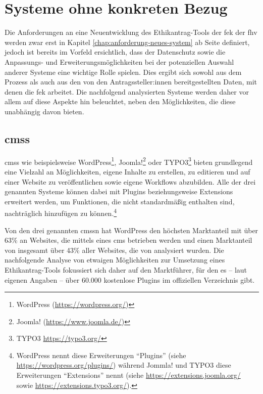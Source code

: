 \documentclass[a4paper,12pt,twoside]{scrreprt}
\begin{document}
\section{Systeme ohne konkreten Bezug}
\label{sec:systeme-ohne-bezug}

Die Anforderungen an eine Neuentwicklung des Ethikantrag-Tools der \ac{fek} der \ac{fhv} werden zwar erst in Kapitel \ref{chap:anforderung-neues-system} ab Seite \pageref{chap:anforderung-neues-system} definiert, jedoch ist bereits im Vorfeld ersichtlich, dass der Datenschutz sowie die Anpassungs- und Erweiterungsmöglichkeiten bei der potenziellen Auswahl anderer Systeme eine wichtige Rolle spielen. Dies ergibt sich sowohl aus dem Prozess als auch aus den von den Antragssteller:innen bereitgestellten Daten, mit denen die \acl{fek} arbeitet. Die nachfolgend analysierten Systeme werden daher vor allem auf diese Aspekte hin beleuchtet, neben den Möglichkeiten, die diese unabhängig davon bieten.

\subsection{\aclp{cms}}
\label{sub-sec:cms-syteme}

\acp{cms} wie beispielsweise WordPress\footnote{WordPress (\url{https://wordpress.org/})}, Joomla!\footnote{Joomla! (\url{https://www.joomla.de/})} oder TYPO3\footnote{TYPO3 \url{https://typo3.org/}} bieten grundlegend eine Vielzahl an Möglichkeiten, eigene Inhalte zu erstellen, zu editieren und auf einer Website zu veröffentlichen sowie eigene Workflows abzubilden. \cite{oracle_corporation_who_2022} Alle der drei genannten Systeme können dabei mit Plugins beziehungsweise Extensions erweitert werden, um Funktionen, die nicht standardmäßig enthalten sind, nachträglich hinzufügen zu können.\footnote{WordPress nennt diese Erweiterungen \enquote{Plugins} (siehe \url{https://wordpress.org/plugins/}) während Jommla! und TYPO3 diese Erweiterungen \enquote{Extensions} nennt (siehe \url{https://extensions.joomla.org/} sowie \url{https://extensions.typo3.org/}).}

\medskip

Von den drei genannten \aclp{cms}n hat WordPress den höchsten Marktanteil mit über 63\% an Websites, die mittels eines \ac{cms} betrieben werden und einen Marktanteil von insgesamt über 43\% aller Websites, die von \cite{q-success_di_gelbmann_gmbh_usage_2023} analysiert wurden. Die nachfolgende Analyse von etwaigen Möglichkeiten zur Umsetzung eines Ethikantrag-Tools fokussiert sich daher auf den Marktführer, für den es -- laut eigenen Angaben \cite{wordpress_foundation_wordpress_2023} -- über 60.000 kostenlose Plugins im offiziellen Verzeichnis gibt.
\end{document}
